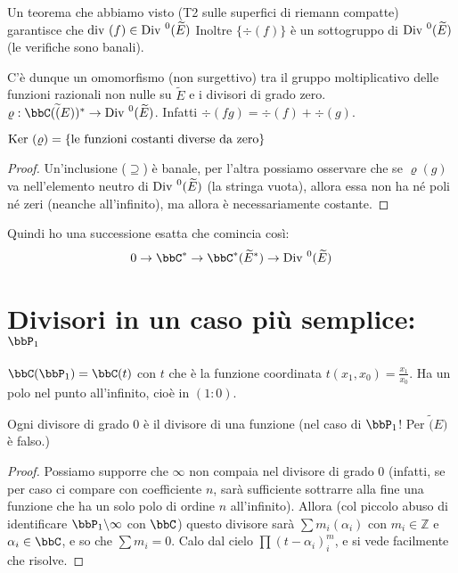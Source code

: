 Un teorema che abbiamo visto (T2 sulle superfici di riemann compatte) garantisce che $\mbox{div }(f) \in \mbox{Div }^0(\widetilde{E})$
Inoltre $\{\div(f)\}$ è un sottogruppo di $\mbox{Div }^0(\widetilde{E})$ (le verifiche sono banali).

C'è dunque un omomorfismo (non surgettivo) tra il gruppo moltiplicativo delle funzioni razionali non nulle su $\widetilde{E}$ e i divisori di grado zero.
$\varrho: \bbC(\widetilde(E))^* \rightarrow \Div^0(\widetilde{E})$. Infatti $\div(fg)=\div(f)+\div(g)$.

\begin{proposizione}
$\mbox{Ker }(\varrho) = \{\text{le funzioni costanti diverse da zero}\}$
\end{proposizione}
\begin{proof}
Un'inclusione ($\supseteq$) è banale, per l'altra possiamo osservare che se $\varrho(g)$ va nell'elemento
neutro di $\mbox{Div }^0(\widetilde{E})$ (la stringa vuota), allora essa non ha né poli né zeri (neanche all'infinito), ma allora è necessariamente costante.
\end{proof}

\begin{osservazione}
Quindi ho una successione esatta che comincia così:
$$0 \rightarrow \bbC^* \rightarrow \bbC^*(\widetilde{E}^*) \rightarrow \Div^0(\widetilde{E})$$
\end{osservazione}


\section{Divisori in un caso più semplice: $\bbP_1$}
$\bbC(\bbP_1) = \bbC(t)$ con $t$ che è la funzione coordinata $t(x_1, x_0)=\frac{x_1}{x_0}$.
Ha un polo nel punto all'infinito, cioè in $(1:0)$.

\begin{proposizione}
Ogni divisore di grado $0$ è il divisore di una funzione (nel caso di $\bbP_1$! Per $\widetilde(E)$ è falso.)
\end{proposizione}
\begin{proof}
Possiamo supporre che $\infty$ non compaia nel divisore di grado $0$ (infatti, se per caso ci compare con coefficiente $n$,
sarà sufficiente sottrarre alla fine una funzione che ha un solo polo di ordine $n$ all'infinito).
Allora (col piccolo abuso di identificare $\bbP_1 \backslash \infty$ con $\bbC$)
questo divisore sarà $\sum m_i (\alpha_i)$ con $m_i \in \mathbb{Z}$ e $\alpha_i \in \bbC$, e so che $\sum m_i=0$.
Calo dal cielo $\prod(t-\alpha_i)^m_i$, e si vede facilmente che risolve.
\end{proof}


